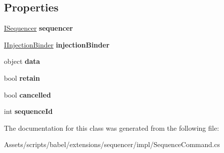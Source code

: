 \subsection*{Properties}
\begin{DoxyCompactItemize}
\item 
\hypertarget{classbabel_1_1extensions_1_1sequencer_1_1impl_1_1_sequence_command_a76a99ed6b7fd8fc622f091bab6deea9b}{\hyperlink{interfacebabel_1_1extensions_1_1sequencer_1_1api_1_1_i_sequencer}{I\-Sequencer} {\bfseries sequencer}}\label{classbabel_1_1extensions_1_1sequencer_1_1impl_1_1_sequence_command_a76a99ed6b7fd8fc622f091bab6deea9b}

\item 
\hypertarget{classbabel_1_1extensions_1_1sequencer_1_1impl_1_1_sequence_command_afbc2398063508c1341508a179ff5608f}{\hyperlink{interfacebabel_1_1extensions_1_1injector_1_1api_1_1_i_injection_binder}{I\-Injection\-Binder} {\bfseries injection\-Binder}}\label{classbabel_1_1extensions_1_1sequencer_1_1impl_1_1_sequence_command_afbc2398063508c1341508a179ff5608f}

\item 
\hypertarget{classbabel_1_1extensions_1_1sequencer_1_1impl_1_1_sequence_command_a81875785d5f301fa1790fd7bc7e8f770}{object {\bfseries data}}\label{classbabel_1_1extensions_1_1sequencer_1_1impl_1_1_sequence_command_a81875785d5f301fa1790fd7bc7e8f770}

\item 
\hypertarget{classbabel_1_1extensions_1_1sequencer_1_1impl_1_1_sequence_command_afa81720a6cd6bcb5f44f0c2d8d1dc982}{bool {\bfseries retain}}\label{classbabel_1_1extensions_1_1sequencer_1_1impl_1_1_sequence_command_afa81720a6cd6bcb5f44f0c2d8d1dc982}

\item 
\hypertarget{classbabel_1_1extensions_1_1sequencer_1_1impl_1_1_sequence_command_ae58dbde11655765e475a540a7a77c964}{bool {\bfseries cancelled}}\label{classbabel_1_1extensions_1_1sequencer_1_1impl_1_1_sequence_command_ae58dbde11655765e475a540a7a77c964}

\item 
\hypertarget{classbabel_1_1extensions_1_1sequencer_1_1impl_1_1_sequence_command_a59eb2aefabaa20fadbfa31c9f0bd03ef}{int {\bfseries sequence\-Id}}\label{classbabel_1_1extensions_1_1sequencer_1_1impl_1_1_sequence_command_a59eb2aefabaa20fadbfa31c9f0bd03ef}

\end{DoxyCompactItemize}


The documentation for this class was generated from the following file\-:\begin{DoxyCompactItemize}
\item 
Assets/scripts/babel/extensions/sequencer/impl/Sequence\-Command.\-cs\end{DoxyCompactItemize}
